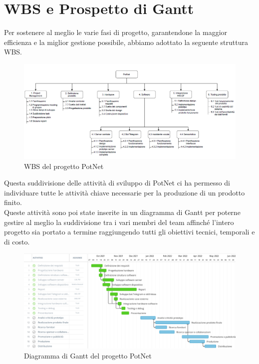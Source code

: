 \newpage
\section{WBS e Prospetto di Gantt}

Per sostenere al meglio le varie fasi di progetto, garantendone la maggior efficienza e la miglior gestione possibile, abbiamo adottato la seguente struttura WBS.

\begin{figure}[ht!]
	\centering
	\includegraphics[width=\textwidth]{./images/wbs.PNG} 
	\caption{WBS del progetto PotNet \label{overflow}}
\end{figure}

Questa suddivisione delle attività di sviluppo di PotNet ci ha permesso di individuare tutte le attività chiave necessarie per la produzione di un prodotto finito.\\
Queste attività sono poi state inserite in un diagramma di Gantt per poterne gestire al meglio la suddivisione tra i vari membri del team affinché l'intero progetto sia portato a termine raggiungendo tutti gli obiettivi tecnici, temporali e di costo.

\begin{figure}[ht!]
	\centering
	\includegraphics[angle=0,origin=c,width=\textwidth]{./images/Gannt.PNG} 
	\caption{Diagramma di Gantt del progetto PotNet \label{overflow}}
\end{figure}

\newpage
\theendnotes